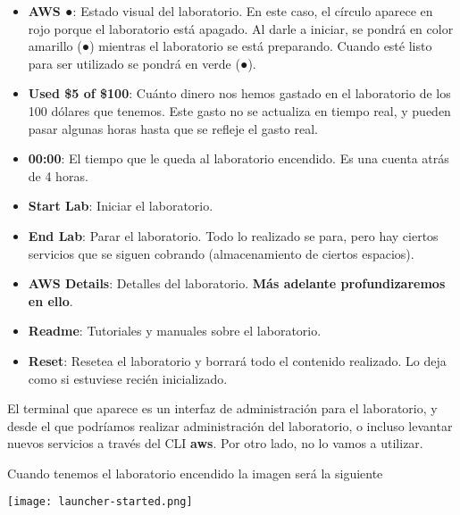 \begin{itemize}
	\item \textbf{AWS \color{red}●}: Estado visual del laboratorio. En este caso, el círculo aparece en rojo porque el laboratorio está apagado. Al darle a iniciar, se pondrá en color amarillo ({\color{yellow}●}) mientras el laboratorio se está preparando. Cuando esté listo para ser utilizado se pondrá en verde ({\color{green}●}).
	
	\item \textbf{Used \$5 of \$100}: Cuánto dinero nos hemos gastado en el laboratorio de los 100 dólares que tenemos. Este gasto no se actualiza en tiempo real, y pueden pasar algunas horas hasta que se refleje el gasto real.
	
	\item \textbf{00:00}: El tiempo que le queda al laboratorio encendido. Es una cuenta atrás de 4 horas. 
	
	\item \faPlay  \textbf{ Start Lab}: Iniciar el laboratorio.
	
	\item \faStop  \textbf{ End Lab}: Parar el laboratorio. Todo lo realizado se para, pero hay ciertos servicios que se siguen cobrando (almacenamiento de ciertos espacios).
	
	\item \faInfo  \textbf{ AWS Details}: Detalles del laboratorio. \textbf{Más adelante profundizaremos en ello}.
	
	\item \faInfo  \textbf{ Readme}: Tutoriales y manuales sobre el laboratorio.
	
	\item \faUndo \textbf{ Reset}: Resetea el laboratorio y borrará todo el contenido realizado. Lo deja como si estuviese recién inicializado.
\end{itemize}

El terminal que aparece es un interfaz de administración para el laboratorio, y desde el que podríamos realizar administración del laboratorio, o incluso levantar nuevos servicios a través del CLI \textbf{aws}. Por otro lado, no lo vamos a utilizar.


Cuando tenemos el laboratorio encendido la imagen será la siguiente

\begin{center}
	\texttt{[image: launcher-started.png]}
\end{center}

